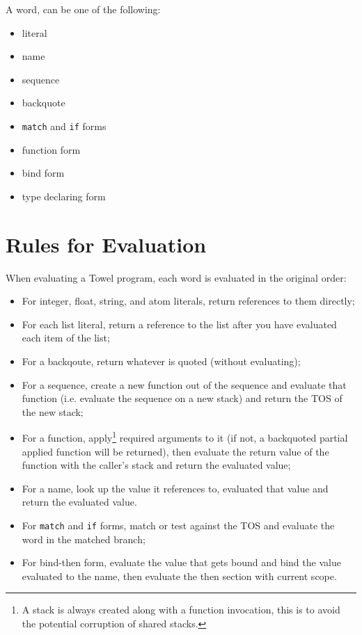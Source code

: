 \documentclass{book}
\begin{document}
A word, can be one of the following:
\begin{itemize}
\item literal
\item name
\item sequence
\item backquote
\item \texttt{match} and \texttt{if} forms
\item function form
\item bind form
\item type declaring form
\end{itemize}

\section{Rules for Evaluation}

When evaluating a Towel program, each word is evaluated in the original order:
\begin{itemize}
\item For integer, float, string, and atom literals, return references to them directly;
\item For each list literal, return a reference to the list after you have evaluated each item of the list;
\item For a backqoute, return whatever is quoted (without evaluating);
\item For a sequence, create a new function out of the sequence and evaluate that function (i.e. evaluate the sequence on a new stack) and return the TOS of the new stack;
\item For a function, apply\footnote{A stack is always created along with a function invocation, this is to avoid the potential corruption of shared stacks.} required arguments to it (if not, a backquoted partial applied function will be returned), then evaluate the return value of the function with the caller's stack and return the evaluated value;
\item For a name, look up the value it references to, evaluated that value and return the evaluated value.
\item For \texttt{match} and \texttt{if} forms, match or test against the TOS and evaluate the word in the matched branch;
\item For bind-then form, evaluate the value that gets bound and bind the value evaluated to the name, then evaluate the then section with current scope.
\end{itemize}
\end{document}
